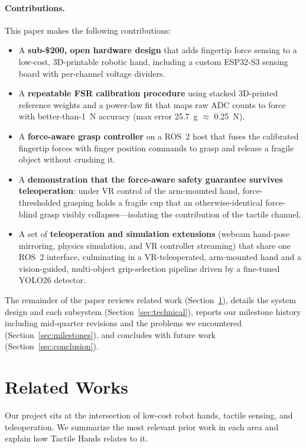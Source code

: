 \documentclass[acmlarge,screen,nonacm]{acmart}
\begin{document}
\paragraph{Contributions.} This paper makes the following contributions:
\begin{itemize}
  \item A \textbf{sub-\$200, open hardware design} that adds fingertip force
        sensing to a low-cost, 3D-printable robotic hand, including a custom
        ESP32-S3 sensing board with per-channel voltage dividers.
  \item A \textbf{repeatable FSR calibration procedure} using stacked 3D-printed
        reference weights and a power-law fit that maps raw ADC counts to force
        with better-than-1~N accuracy (max error 25.7~g $\approx$ 0.25~N).
  \item A \textbf{force-aware grasp controller} on a ROS~2 host that fuses the
        calibrated fingertip forces with finger position commands to grasp and
        release a fragile object without crushing it.
  \item A \textbf{demonstration that the force-aware safety guarantee survives
        teleoperation}: under VR control of the arm-mounted hand, force-thresholded
        grasping holds a fragile cup that an otherwise-identical force-blind
        grasp visibly collapses---isolating the contribution of the tactile
        channel.
  \item A set of \textbf{teleoperation and simulation extensions}
        (webcam hand-pose mirroring, physics simulation, and VR controller
        streaming) that share one ROS~2 interface, culminating in a
        VR-teleoperated, arm-mounted hand and a vision-guided, multi-object
        grip-selection pipeline driven by a fine-tuned YOLO26 detector.
\end{itemize}

The remainder of the paper reviews related work
(Section~\ref{sec:related}), details the system design and each subsystem
(Section~\ref{sec:technical}), reports our milestone history including
mid-quarter revisions and the problems we encountered
(Section~\ref{sec:milestones}), and concludes with future work
(Section~\ref{sec:conclusion}).

\section{Related Works}
\label{sec:related}
Our project sits at the intersection of low-cost robot hands, tactile sensing,
and teleoperation. We summarize the most relevant prior work in each area and
explain how Tactile Hands relates to it.
\end{document}
